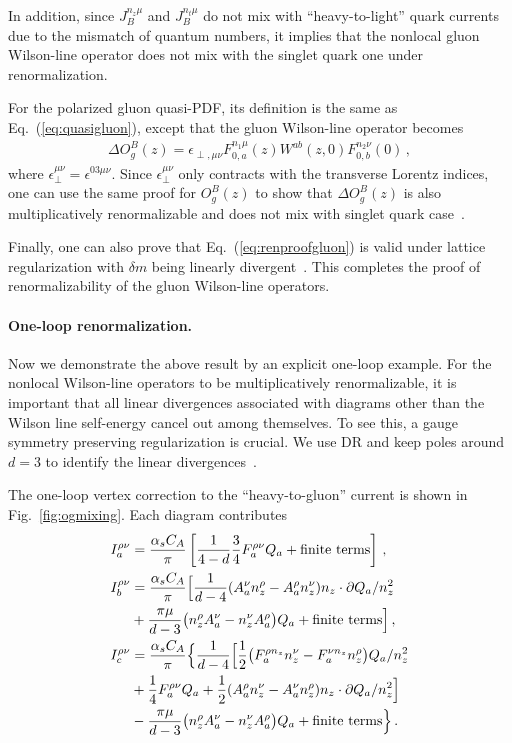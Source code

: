 \documentclass[aps,rmp,reprint,amsmath,amssymb,graphicx,longbibliography]{revtex4-1} %
\newcommand{\nn}{\nonumber}
\DeclareRobustCommand{\eq}[1]{Eq.~(\ref{eq:#1})}
\DeclareRobustCommand{\fig}[1]{Fig.~\ref{fig:#1}}
\begin{document}
In addition, since $J_{B}^{n_z\mu}$ and $J_{B}^{n_t\mu}$ do not mix with ``heavy-to-light'' quark currents due to the mismatch of quantum numbers, it implies that the nonlocal gluon Wilson-line operator does not mix with the singlet quark one under renormalization.

\vspace{.3cm}
For the polarized gluon quasi-PDF, its definition is the same as \eq{quasigluon}, except that the gluon Wilson-line operator becomes
\begin{align}
	\Delta O^B_g(z) = \epsilon_{\perp,\mu\nu} F^{n_1\mu}_{0,a}(z) W^{ab}(z,0) F^{n_2\nu}_{0,b}(0)\,,
\end{align}
where $\epsilon_{\perp}^{\mu\nu}=\epsilon^{03\mu\nu}$. Since $\epsilon_{\perp}^{\mu\nu}$ only contracts with the transverse Lorentz indices, one can use the same proof for $O^B_g(z)$ to show that $\Delta O^B_g(z)$ is also multiplicatively renormalizable and does not mix with singlet quark case~\cite{Zhang:2018diq}.

Finally, one can also prove that \eq{renproofgluon} is valid under lattice regularization with $\delta m$ being linearly divergent~\cite{Zhang:2018diq}. This completes the proof of renormalizability of the gluon Wilson-line operators.

\paragraph*{One-loop renormalization.}
Now we demonstrate the above result by an explicit one-loop example. For the nonlocal Wilson-line operators to be multiplicatively renormalizable, it is important that all linear divergences associated with diagrams other than the Wilson line self-energy cancel out among themselves. To see this, a gauge symmetry preserving regularization is crucial. We use DR and keep poles around $d=3$ to identify the linear divergences~\cite{Zhang:2018diq,Wang:2019tgg}.

The one-loop vertex correction to the ``heavy-to-gluon'' current is shown in \fig{ogmixing}. Each diagram contributes
\begin{align}\label{eq:pole_auxiliary}
	I_a^{\rho\nu}&= \frac{\alpha_s C_A}{\pi}\left[{1\over 4-d}{3\over 4} F_a^{\rho\nu}Q_a + {\rm finite\ terms}\right]\,,\nn\\
	I_b^{\rho\nu}&= \frac{\alpha_s C_A}{\pi}\Big[\frac{1}{d-4}(A_a^\nu n_z^\rho-A_a^\rho n_z^\nu) n_z\cdot \partial Q_a/n_z^2 \nn\\
	&+\frac{\pi\mu}{d-3}\big(n_z^\rho A_a^\nu-n_z^\nu A_a^\rho\big)Q_a+{\rm finite\ terms}\Big]\,,\nonumber\\
	I_c^{\rho\nu}&=\frac{\alpha_s C_A}{\pi}\Big\{\frac{1}{d-4}\Big[\frac{1}{2}\big(F_a^{\rho n_z}n_z^\nu -F_a^{\nu n_z}n_z^\rho \big) Q_a/n_z^2 \nn\\
	&+\frac{1}{4}F_a^{\rho\nu}Q_a+\frac 1 2 (A_a^\rho n_z^\nu-A_a^\nu n_z^\rho) n_z\cdot \partial Q_a/n_z^2\Big]\nonumber\\
	&-\frac{\pi\mu}{d-3}\big(n_z^\rho A_a^\nu-n_z^\nu A_a^\rho\big) Q_a+{\rm finite\ terms}\Big\}\,.
\end{align}
\end{document}
